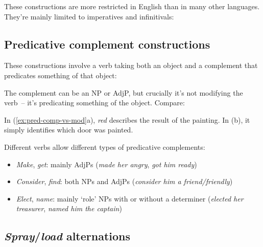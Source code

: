 These constructions are more restricted in English than in many other languages. They're mainly limited to imperatives and infinitivals:

\ea\label{ex:serial-forms}
   \z
\z{}

\subsection{Predicative complement constructions}

These constructions involve a verb taking both an object and a complement that predicates something of that object:

\ea\label{ex:pred-comp}
   \z
\z

The complement can be an NP or AdjP, but crucially it's not modifying the verb~-- it's predicating something of the object. Compare:

\ea\label{ex:pred-comp-vs-mod}
   \z
\z

In (\ref{ex:pred-comp-vs-mod}a), \textit{red} describes the result of the painting. In (b), it simply identifies which door was painted.

Different verbs allow different types of predicative complements:
\begin{itemize}[noitemsep]
   \item \textit{Make}, \textit{get}: mainly AdjPs (\textit{made her angry}, \textit{got him ready})
   \item \textit{Consider}, \textit{find}: both NPs and AdjPs (\textit{consider him a friend/friendly})
   \item \textit{Elect}, \textit{name}: mainly `role' NPs with or without a determiner (\textit{elected her treasurer}, \textit{named him the captain})
\end{itemize}

\subsection{\textit{Spray}/\textit{load} alternations}

